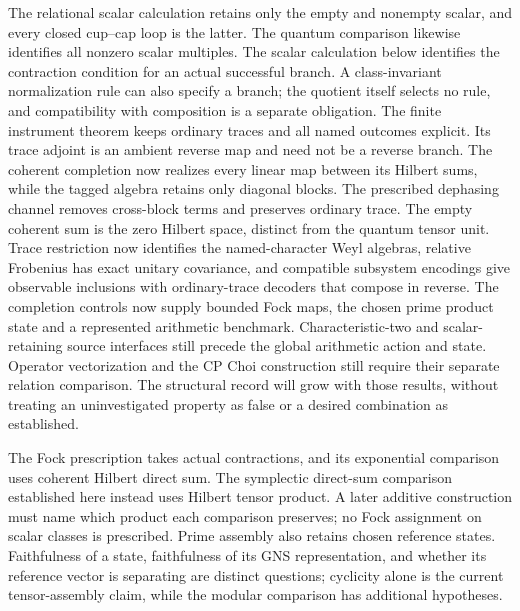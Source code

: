 The relational scalar calculation retains only the empty and nonempty
scalar, and every closed cup--cap loop is the latter. The quantum
comparison likewise identifies all nonzero scalar multiples. The scalar
calculation below identifies the contraction condition for an actual
successful branch. A class-invariant normalization rule can also specify a
branch; the quotient itself selects no rule, and compatibility with
composition is a separate obligation. The finite instrument theorem keeps
ordinary traces and all named outcomes explicit. Its trace adjoint is an
ambient reverse map and need not be a reverse branch. The coherent completion now realizes every linear map between its Hilbert
sums, while the tagged algebra retains only diagonal blocks. The prescribed
dephasing channel removes cross-block terms and preserves ordinary trace.
The empty coherent sum is the zero Hilbert space, distinct from the quantum
tensor unit. Trace restriction now identifies the named-character Weyl
algebras, relative Frobenius has exact unitary covariance, and compatible
subsystem encodings give observable inclusions with ordinary-trace decoders
that compose in reverse. The completion controls now supply bounded Fock
maps, the chosen prime product state and a represented arithmetic benchmark.
Characteristic-two and scalar-retaining source interfaces still precede the
global arithmetic action and state. Operator vectorization and the
CP Choi construction still require their separate relation comparison.
The structural record will grow with those results, without treating an
uninvestigated property as false or a desired combination as established.

The Fock prescription takes actual contractions, and its exponential
comparison uses coherent Hilbert direct sum. The symplectic direct-sum
comparison established here instead uses Hilbert tensor product. A later
additive construction must name which product each comparison preserves;
no Fock assignment on scalar classes is prescribed. Prime assembly also
retains chosen reference states. Faithfulness of a state, faithfulness of
its GNS representation, and whether its reference vector is separating
are distinct questions; cyclicity alone is the current tensor-assembly
claim, while the modular comparison has additional hypotheses.

